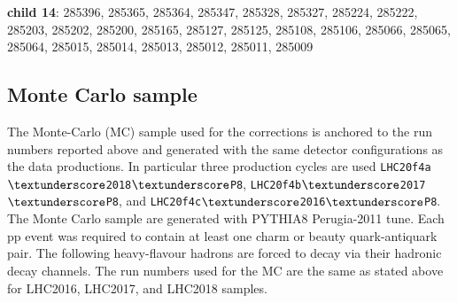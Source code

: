 \begin{itemize}
	\textbf{child 14}: 285396, 285365, 285364, 285347, 285328, 285327, 285224, 285222, 285203, 285202, 285200, 285165, 285127, 285125, 285108, 285106, 285066, 285065, 285064, 285015, 285014, 285013, 285012, 285011, 285009


\end{itemize}

\subsection{Monte Carlo sample}
\label{sec:mc_sample}
The Monte-Carlo (MC) sample used for the corrections is anchored to the run numbers reported above and generated with the same detector configurations as the data productions. In particular three production cycles are used  \texttt{LHC20f4a$\textunderscore$2018$\textunderscore$P8}, \texttt{LHC20f4b$\textunderscore$2017$\textunderscore$P8}, and \texttt{LHC20f4c$\textunderscore$2016$\textunderscore$P8}. The Monte Carlo sample are generated with PYTHIA8 Perugia-2011 tune. Each pp event was required to contain at least one charm or beauty quark-antiquark pair. The following heavy-flavour hadrons are forced to decay via their hadronic decay channels. The run numbers used for the MC are the same as stated above for LHC2016, LHC2017, and LHC2018 samples.




